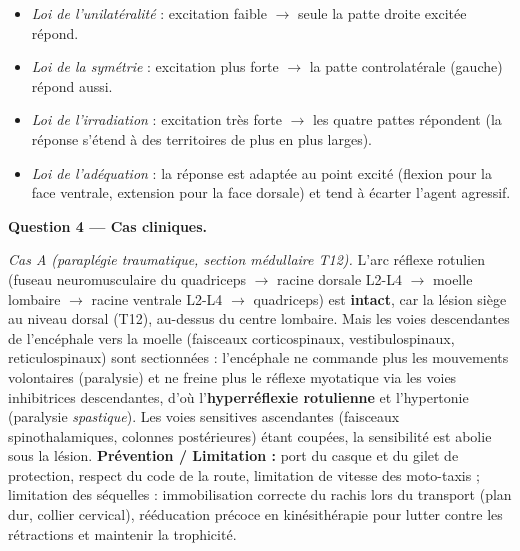 \documentclass[11pt]{article}
\begin{document}
\begin{exoresolu}
\begin{itemize}
\item \emph{Loi de l'unilatéralité} : excitation faible $\rightarrow$ seule la patte droite excitée répond.
\item \emph{Loi de la symétrie} : excitation plus forte $\rightarrow$ la patte controlatérale (gauche) répond aussi.
\item \emph{Loi de l'irradiation} : excitation très forte $\rightarrow$ les quatre pattes répondent (la réponse s'étend à des territoires de plus en plus larges).
\item \emph{Loi de l'adéquation} : la réponse est adaptée au point excité (flexion pour la face ventrale, extension pour la face dorsale) et tend à écarter l'agent agressif.
\end{itemize}

\textbf{Question 4 — Cas cliniques.}

\emph{Cas A (paraplégie traumatique, section médullaire T12).}
L'arc réflexe rotulien (fuseau neuromusculaire du quadriceps $\rightarrow$ racine dorsale L2-L4 $\rightarrow$ moelle lombaire $\rightarrow$ racine ventrale L2-L4 $\rightarrow$ quadriceps) est \textbf{intact}, car la lésion siège au niveau dorsal (T12), au-dessus du centre lombaire. Mais les voies descendantes de l'encéphale vers la moelle (faisceaux corticospinaux, vestibulospinaux, reticulospinaux) sont sectionnées : l'encéphale ne commande plus les mouvements volontaires (paralysie) et ne freine plus le réflexe myotatique via les voies inhibitrices descendantes, d'où l'\textbf{hyperréflexie rotulienne} et l'hypertonie (paralysie \emph{spastique}). Les voies sensitives ascendantes (faisceaux spinothalamiques, colonnes postérieures) étant coupées, la sensibilité est abolie sous la lésion.
\textbf{Prévention / Limitation :} port du casque et du gilet de protection, respect du code de la route, limitation de vitesse des moto-taxis ; limitation des séquelles : immobilisation correcte du rachis lors du transport (plan dur, collier cervical), rééducation précoce en kinésithérapie pour lutter contre les rétractions et maintenir la trophicité.

\begin{popfigure}
\end{popfigure}
\end{exoresolu}
\end{document}
